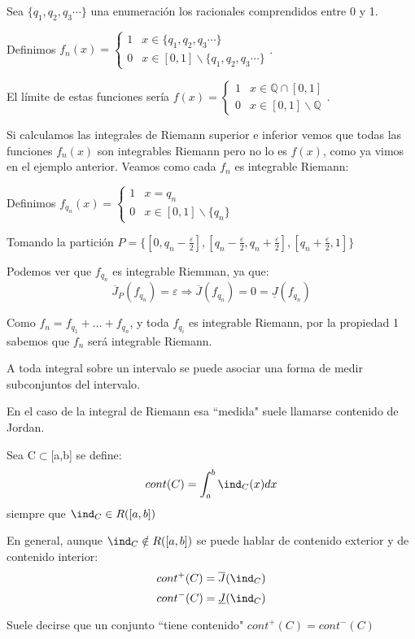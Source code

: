 \documentclass{apuntes}
\begin{document}
\begin{example}
Sea $\lbrace q_1, q_2, q_3 \cdots \rbrace$ una enumeración los racionales comprendidos entre 0 y 1.

Definimos $f_n(x)=\begin{cases}
   1 &  x \in \lbrace q_1, q_2, q_3 \cdots \rbrace \\
   0       &  x \in [0,1] \backslash \lbrace q_1, q_2, q_3 \cdots \rbrace
  \end{cases}$.
  
El límite de estas funciones sería $f(x)=\begin{cases}
   1 &  x \in \mathbb{Q} \cap [0,1] \\
   0       &  x \in [0,1] \backslash \mathbb{Q}
  \end{cases}$.

Si calculamos las integrales de Riemann superior e inferior vemos que todas las funciones $f_n(x)$ son integrables Riemann pero no lo es $f(x)$, como ya vimos en el ejemplo anterior.
 Veamos como cada $f_n$ es integrable Riemann:


Definimos $f_{q_n}(x) =\begin{cases}
	1 & x = q_n\\
	0 & x \in [0,1] \backslash \{q_n\}
	\end{cases}
$

Tomando la partición
$P = \{ [0, q_n - \frac{\varepsilon}{2}], [q_n - \frac{\varepsilon}{2}, q_n + \frac{\varepsilon}{2}], [q_n + \frac{\varepsilon}{2}, 1] \}$


Podemos ver que $f_{q_n}$ es integrable Riemman, ya que:
\[\overline{J}_P (f_{q_n}) = \varepsilon \Rightarrow \overline{J} (f_{q_n}) = 0 = \underline{J} (f_{q_n})\]

Como $f_n = f_{q_1} + \ldots + f_{q_n}$, y toda $ f_{q_i}$ es integrable Riemann, por la propiedad 1 sabemos que $f_n$ será integrable Riemann.
\end{example}

\begin{defn}[Contenido]
A toda integral sobre un intervalo se puede asociar una forma de medir subconjuntos del intervalo.

En el caso de la integral de Riemann esa ``medida" suele llamarse contenido de Jordan.

Sea C$\subset$[a,b] se define:
\[cont(C) = \int_a^b \ind_{C}(x) dx\]
siempre que $\ind_C \in R([a,b])$

En general, aunque $\ind_C \notin R([a,b])$ se puede hablar de contenido exterior y de contenido interior:
\[cont^+(C)=\overline{J}(\ind_C)\]
\[cont^-(C)=\underline{J}(\ind_C)\]

Suele decirse que un conjunto ``tiene contenido" $cont^+(C)=cont^-(C)$
\end{defn}
\end{document}
